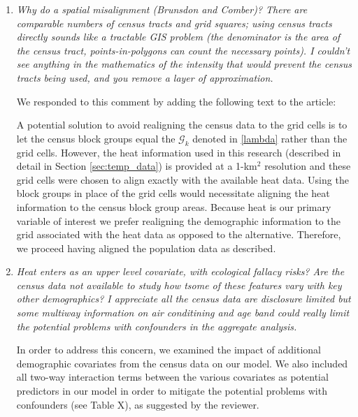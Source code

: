 \documentclass{article}
\begin{document}
\begin{enumerate}

\item\textit{Why do a spatial misalignment (Brunsdon and Comber)?   There are comparable numbers of census tracts and grid squares; using census tracts directly sounds like a tractable GIS problem (the denominator is the area of the census tract, points-in-polygons can count the necessary points).   I couldn't see anything in the mathematics of the intensity that would prevent the census tracts being used, and you remove a layer of approximation.}

We responded to this comment by adding the following text to the article:

\begin{displayquote}
A potential solution to avoid realigning the census data to the grid cells is to let the census block groups equal the $\mathcal{G}_k$ denoted in \eqref{lambda} rather than the grid cells. However, the heat information used in this research (described in detail in Section \ref{sec:temp_data}) is provided at a 1-km$^2$ resolution and these grid cells were chosen to align exactly with the available heat data. Using the block groups in place of the grid cells would necessitate aligning the heat information to the census block group areas. Because heat is our primary variable of interest we prefer realigning the demographic information to the grid associated with the heat data as opposed to the alternative. Therefore, we proceed having aligned the population data as described.
\end{displayquote}

\item\textit{Heat enters as an upper level covariate, with ecological fallacy risks?   Are the census data not available to study how tsome of these features vary with key other demographics?   I appreciate all the census data are disclosure limited but some multiway information on air conditining and age band could really limit the potential problems with confounders in the aggregate analysis.}

In order to address this concern, we examined the impact of additional demographic covariates from the census data on our model. We also included all two-way interaction terms between the various covariates as potential predictors in our model in order to mitigate the potential problems with confounders (see Table X), as suggested by the reviewer. 


\end{enumerate}
\end{document}
